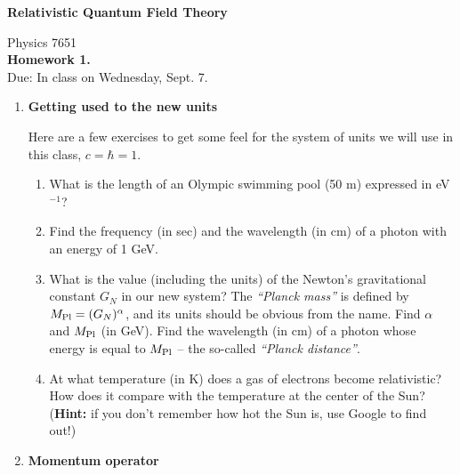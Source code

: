 \textwidth 6.5in
\oddsidemargin 0in
\evensidemargin 0in
\textheight 8.6in
\topmargin -0.5in
\pagestyle{empty}


\vspace*{-1cm}
\begin{center}
{\LARGE \bf Relativistic Quantum Field Theory}

\vspace*{0.5cm}
{\Large Physics 7651} \\
\vspace*{0.5cm}
{\Large {\bf Homework 1. }\\
\vspace*{0.5cm}
Due: In class on Wednesday, Sept. 7.}
\end{center}
\begin{enumerate}

\item  {\bf Getting used to the new units} 

Here are a few exercises to get some 
feel for the system of units we will use in this class, $c=\hbar=1$.

\begin{enumerate}

\item What is the length of an Olympic swimming pool (50 m) expressed in 
eV$^{-1}$?

\item Find the frequency (in sec) and the wavelength (in cm) of a photon with 
an energy of 1 GeV.  

\item What is the value (including the units) of the Newton's gravitational 
constant $G_N$ in our new system? The {\it ``Planck mass''} is defined by 
$M_{\rm Pl}=(G_N)^\alpha$, and its units should be obvious from the name.
Find $\alpha$ and $M_{\rm Pl}$ (in GeV). Find the wavelength (in cm) of a 
photon whose energy is equal to $M_{\rm Pl}$ -- the so-called {\it ``Planck 
distance''}. 

\item At what temperature (in K) does a gas of electrons become relativistic? 
How does it compare with the temperature at the center of the Sun? 
({\bf Hint:} if you don't remember how hot the Sun is, use Google to find out!)


\end{enumerate}


 \vspace*{0.5cm}

\item {\bf Momentum operator}


\end{enumerate}
